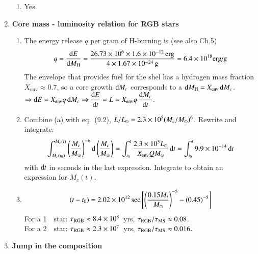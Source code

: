 \documentclass[11pt,a4paper,fleqn]{report}
\begin{document}
\begin{enumerate}
\begin{enumerate}
  \item Yes.

  \end{enumerate}


\item {\bf Core mass - luminosity relation for RGB stars}

  \begin{enumerate}

  \item The energy release $q$ per gram of H-burning is (see also
    Ch.5)
    \[
    q = \frac{\mathrm{d} E}{\mathrm{d} M_\mathrm{H}} = \frac{26.73 \times 10^6 \times
      1.6\times 10^{-12}\,\mathrm{erg}}{4 \times 1.67 \times 10^{-24}\,
      \mathrm{g}} = 6.4 \times 10^{18} \text{erg/g}
    \]
    The envelope that provides fuel for the shel has a hydrogen mass
    fraction $X_\mathrm{env} \approx 0.7$, so a core growth $\mathrm{d} M_c$
    corresponds to a $\mathrm{d} M_\mathrm{H} = X_\mathrm{env}\, \mathrm{d} M_c$. \\
    $ \Rightarrow \mathrm{d} E = X_\mathrm{env} q\, \mathrm{d} M_c \Rightarrow
    \displaystyle \frac{\mathrm{d} E}{\mathrm{d} t} = L = X_\mathrm{env} q\,
    \frac{\mathrm{d} M_c}{\mathrm{d} t} $.

  \item Combine (a) with eq.~(9.2), ${L}/{L}_\odot= 2.3\times10^5
    ({{M_c}/{{M}_\odot}})^6$. Rewrite and integrate:
    \[
    \int_{M_c(t_0)}^{M_c(t)} \left( \frac{M_c}{{M}_\odot} \right)^{-6} \mathrm{d}
      \left( \frac{M_c}{{M}_\odot} \right) 
    = \int_{t_0}^{t} \frac{2.3\times 10^5{L}_\odot}{X_\mathrm{env} Q {M}_\odot}\,
      \mathrm{d} t
    = \int_{t_0}^{t} 9.9\times10^{-14}\, \mathrm{d} t
    \] 
    with $\mathrm{d} t$ in seconds in the last expression. Integrate to obtain
    an expression for $M_c(t)$.

  \item
    \[
    (t - t_0) = 2.02\times 10^{12}\, \mathrm{sec}\, 
    \Bigg[ \Bigg( \frac{0.15 M_i}{{M}_\odot} \Bigg)^{-5} - (0.45)^{-5} \Bigg]
    \] 
    For a 1~\Msun~star: $\tau_{\rm RGB} \approx 8.4 \times 10^8$~yrs,
    $\tau_{\rm RGB}/\tau_{\rm MS} \approx 0.08$.\\
    For a 2~\Msun~star: $\tau_{\rm RGB} \approx 2.3 \times 10^7$~yrs,
    $\tau_{\rm RGB}/\tau_{\rm MS} \approx 0.016$.
  
  \end{enumerate}


\item {\bf Jump in the composition} 

  \begin{enumerate}


\end{enumerate}
\end{enumerate}
\end{document}
